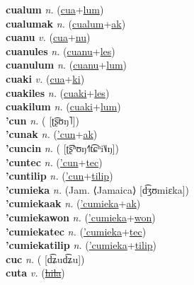 \textbf{cualum} \textit{n.} (\hyperref[cua]{cua}+\hyperref[lum]{lum})
 \label{cualum} \\
\textbf{cualumak} \textit{n.} (\hyperref[cualum]{cualum}+\hyperref[ak]{ak})
 \label{cualumak} \\
\textbf{cuanu} \textit{v.} (\hyperref[cua]{cua}+\hyperref[nu]{nu})
 \label{cuanu} \\
\textbf{cuanules} \textit{n.} (\hyperref[cuanu]{cuanu}+\hyperref[les]{les})
 \label{cuanules} \\
\textbf{cuanulum} \textit{n.} (\hyperref[cuanu]{cuanu}+\hyperref[lum]{lum})
 \label{cuanulum} \\
\textbf{cuaki} \textit{v.} (\hyperref[cua]{cua}+\hyperref[ki]{ki})
 \label{cuaki} \\
\textbf{cuakiles} \textit{n.} (\hyperref[cuaki]{cuaki}+\hyperref[les]{les})
 \label{cuakiles} \\
\textbf{cuakilum} \textit{n.} (\hyperref[cuaki]{cuaki}+\hyperref[lum]{lum})
 \label{cuakilum} \\
\textbf{'cun} \textit{n.} ( [ʈ͡ʂʊŋ˥])
 \label{'cun} \\
\textbf{'cunak} \textit{n.} (\hyperref['cun]{'cun}+\hyperref[ak]{ak})
 \label{'cunak} \\
\textbf{'cuncin} \textit{n.} ( [ʈ͡ʂʰʊŋ˧˥t͡ɕʰi˥˩ŋ])
 \label{'cuncin} \\
\textbf{'cuntec} \textit{n.} (\hyperref['cun]{'cun}+\hyperref[tec]{tec})
 \label{'cuntec} \\
\textbf{'cuntilip} \textit{n.} (\hyperref['cun]{'cun}+\hyperref[tilip]{tilip})
 \label{'cuntilip} \\
\textbf{'cumieka} \textit{n.} (Jam. ⟨Jamaica⟩ [d͡ʒʊmiɛka])
 \label{'cumieka} \\
\textbf{'cumiekaak} \textit{n.} (\hyperref['cumieka]{'cumieka}+\hyperref[ak]{ak})
 \label{'cumiekaak} \\
\textbf{'cumiekawon} \textit{n.} (\hyperref['cumieka]{'cumieka}+\hyperref[won]{won})
 \label{'cumiekawon} \\
\textbf{'cumiekatec} \textit{n.} (\hyperref['cumieka]{'cumieka}+\hyperref[tec]{tec})
 \label{'cumiekatec} \\
\textbf{'cumiekatilip} \textit{n.} (\hyperref['cumieka]{'cumieka}+\hyperref[tilip]{tilip})
 \label{'cumiekatilip} \\
\textbf{cuc} \textit{n.} ( [d͡ʑud͡ʑu])
 \label{cuc} \\
\textbf{cuta} \textit{v.} (\hyperref[hila]{\sout{hila}})
 \label{cuta} \\
